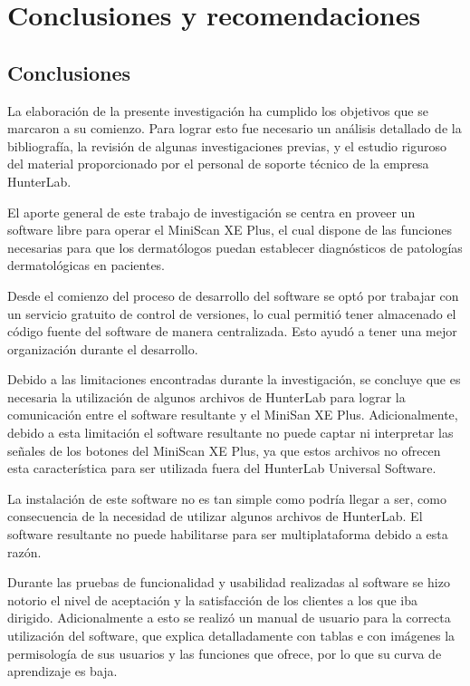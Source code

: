\chapter{Conclusiones y recomendaciones}

\section{Conclusiones}

	La elaboraci\'{o}n de la presente investigaci\'{o}n ha cumplido los objetivos que se marcaron a su comienzo. Para lograr esto fue necesario un an\'{a}lisis detallado de la bibliograf\'{i}a, la revisi\'{o}n de algunas investigaciones previas, y el estudio riguroso del material proporcionado por el personal de soporte t\'{e}cnico de la empresa HunterLab.
	
	El aporte general de este trabajo de investigaci\'{o}n se centra en proveer un software libre para operar el MiniScan XE Plus, el cual dispone de las funciones necesarias para que los dermat\'{o}logos puedan establecer diagn\'{o}sticos de patolog\'{i}as dermatol\'{o}gicas en pacientes.
	
	Desde el comienzo del proceso de desarrollo del software se opt\'{o} por trabajar con un servicio gratuito de control de versiones, lo cual permiti\'{o} tener almacenado el c\'{o}digo fuente del software de manera centralizada. Esto ayud\'{o} a tener una mejor organizaci\'{o}n durante el desarrollo.
	
	Debido a las limitaciones encontradas durante la investigaci\'{o}n, se concluye que es necesaria la utilizaci\'{o}n de algunos archivos de HunterLab para lograr la comunicaci\'{o}n entre el software resultante y el MiniSan XE Plus. Adicionalmente, debido a esta limitaci\'{o}n el software resultante no puede captar ni interpretar las se\~{n}ales de los botones del MiniScan XE Plus, ya que estos archivos no ofrecen esta caracter\'{i}stica para ser utilizada fuera del HunterLab Universal Software.
	
	La instalaci\'{o}n de este software no es tan simple como podr\'{i}a llegar a ser, como consecuencia de la necesidad de utilizar algunos archivos de HunterLab. El software resultante no puede habilitarse para ser multiplataforma debido a esta raz\'{o}n.

	Durante las pruebas de funcionalidad y usabilidad realizadas al software se hizo notorio el nivel de aceptaci\'{o}n y la satisfacci\'{o}n de los clientes a los que iba dirigido. Adicionalmente a esto se realiz\'{o} un manual de usuario para la correcta utilizaci\'{o}n del software, que explica detalladamente con tablas e con im\'{a}genes la permisolog\'{i}a de sus usuarios y las funciones que ofrece, por lo que su curva de aprendizaje es baja.

